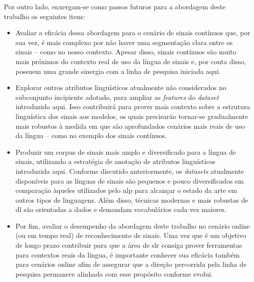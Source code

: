 Por outro lado, enxergam-se como passos futuros para a abordagem deste trabalho os seguintes itens:


\begin{itemize}
    \item Avaliar a eficácia dessa abordagem para o cenário de sinais contínuos que, por sua vez, é mais complexo por não haver uma segmentação clara entre os sinais -- como no nosso contexto.
          Apesar disso, sinais contínuos são muito mais próximos do contexto real de uso da língua de sinais e, por conta disso, possuem uma grande sinergia com a linha de pesquisa iniciada aqui.

    \item Explorar outros atributos linguísticos atualmente não considerados no subconjunto incipiente adotado, para ampliar as \textit{features} do \textit{dataset} introduzido aqui.
          Isso contribuirá para prover mais contexto sobre a estrutura linguística dos sinais aos modelos, os quais precisarão tornar-se gradualmente mais robustos à medida em que são aprofundados cenários mais reais de uso da língua -- como no exemplo dos sinais contínuos.

    \item Produzir um corpus de sinais mais amplo e diversificado para a língua de sinais, utilizando a estratégia de anotação de atributos linguísticos introduzida aqui.
          Conforme discutido anteriormente, os \textit{datasets} atualmente disponíveis para as línguas de sinais são pequenos e pouco diversificados em comparação àqueles utilizados pelo \acrfull{nlp} para alcançar o estado da arte em outros tipos de linguagens.
          Além disso, técnicas modernas e mais robustas de \acrlong{dl} são orientadas a dados e demandam vocabulários cada vez maiores.

    \item Por fim, avaliar o desempenho da abordagem deste trabalho no cenário online (ou em tempo real) de reconhecimento de sinais.
          Uma vez que é um objetivo de longo prazo contribuir para que a área de \acrshort{slr} consiga prover ferramentas para contextos reais da língua, é importante conhecer sua eficácia também para cenários online afim de assegurar que a direção percorrida pela linha de pesquisa permanece alinhada com esse propósito conforme evolui.
\end{itemize}



